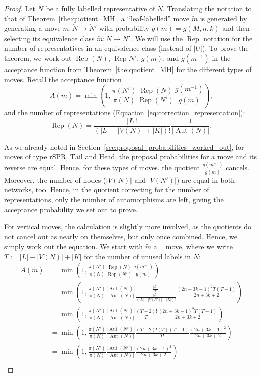 \documentclass{article}
\theoremstyle{definition}
\DeclareMathOperator{\Aut}{Aut}
\DeclareMathOperator{\Rep}{Rep}
\DeclareMathOperator{\VP}{Vert^+}
\newcommand{\Tail}{\mathrm{Tail}}
\newcommand{\Head}{\mathrm{Head}}
\newcommand{\rSPR}{\mathrm{rSPR}}
\begin{document}
\begin{proof}
    Let $\dot{N}$ be a fully labelled representative of $N$. Translating the notation to that of Theorem~\ref{the:quotient_MH}, a ``leaf-labelled'' move $\widetilde{m}$ is generated by generating a move $m:\dot{N} \to \dot{N}'$ with probability $g(m) = g(M,n,k)$ and then selecting its equivalence class $\widetilde{m}: N \to N'$. We will use the $\Rep$ notation for the number of representatives in an equivalence class (instead of $|U|$). To prove the theorem, we work out $\Rep(N)$, $\Rep{N'}$, $g(m)$, and $g(m^{-1})$ in the acceptance function from Theorem~\ref{the:quotient_MH} for the different types of moves. Recall the acceptance function
    \[
        A(\widetilde{m}) = \min\left(1, \frac{\pi(N')}{\pi(N)}\frac{\Rep(N)}{\Rep(N')}\frac{g(m^{-1})}{g(m)} \right),
    \]
    and the number of representations (Equation~\ref{eq:correction_representation}):
    \[ 
        \Rep(N) = \frac{|L|!}{(|L|-|V(N)|+|K|)!} \frac{1}{|\Aut(N)|},
    \]

    As we already noted in Section~\ref{sec:proposal_probabilities_worked_out}, for moves of type $\rSPR$, $\Tail$ and $\Head$, the proposal probabilities for a move and its reverse are equal. Hence, for these types of moves, the quotient $\frac{g(m^{-1})}{g(m)}$ cancels. Moreover, the number of nodes ($|V(N)|$ and $|V(N')|$) are equal in both networks, too. Hence, in the quotient correcting for the number of representations, only the number of automorphisms are left, giving the acceptance probability we set out to prove.

    For vertical moves, the calculation is slightly more involved, as the quotients do not cancel out as neatly on themselves, but only once combined. Hence, we simply work out the equation. We start with $\widetilde{m}$ a $\VP$ move, where we write $T := |L|-|V(N)|+|K|$ for the number of unused labels in $N$:
    \begin{align*}
        A(\widetilde{m}) 
            &= \min\left(1, \frac{\pi(N')}{\pi(N)}\frac{\Rep(N)}{\Rep(N')}\frac{g(m^{-1})}{g(m)} \right)\\
            &= \min\left(1, \frac{\pi(N')}{\pi(N)} \frac{|\Aut(N')|}{|\Aut(N)|} \frac{\frac{|L|!}{T!}}{\frac{|L|!}{(|L|-|V(N')|+|K|)!}} \frac{(2n+3k-1)^2 T (T-1)}{2n + 3k + 2} \right)\\
            &= \min\left(1, \frac{\pi(N')}{\pi(N)} \frac{|\Aut(N')|}{|\Aut(N)|} \frac{(T-2)!}{T!} \frac{(2n+3k-1)^2 T (T-1)}{2n + 3k + 2} \right)\\
            &= \min\left(1, \frac{\pi(N')}{\pi(N)} \frac{|\Aut(N')|}{|\Aut(N)|} \frac{(T-2)!(T)(T-1)}{T!} \frac{(2n+3k-1)^2}{2n + 3k + 2} \right)\\
            &= \min\left(1, \frac{\pi(N')}{\pi(N)} \frac{|\Aut(N')|}{|\Aut(N)|} \frac{(2n+3k-1)^2}{2n + 3k + 2} \right)\\
    \end{align*}


\end{proof}
\end{document}

